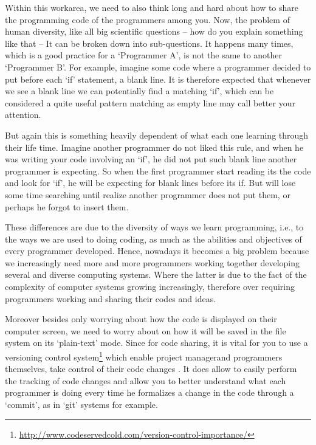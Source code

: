 Within this work\s area, we need to also think long and hard about how to
share the programming code of the programmers among you. Now, the problem of
human diversity, like all big scientific questions -- how do you explain
something like that -- It can be broken down into sub-questions. It happens
many times, which is a good practice for a `Programmer A', is not the same
to another `Programmer B'. For example, imagine some code where a programmer
decided to put before each `if' statement, a blank line. It is therefore
expected that whenever we see a blank line we can potentially find a
matching `if', which can be considered a quite useful pattern matching as
empty line may call better your attention. \cite{aPrettyGoodFormatting}

But again this is something heavily dependent of what each one learning
through their life time. Imagine another programmer do not liked this rule,
and when he was writing your code involving an `if', he did not put such
blank line another programmer is expecting. So when the first programmer
start reading its the code and look for `if', he will be expecting for blank
lines before its if\s. But will lose some time searching until realize
another programmer does not put them, or perhaps he forgot to insert them.
\cite{quantifyingProgramComprehension}

These differences are due to the diversity of ways we learn programming,
i.e., to the ways we are used to doing coding, as much as the abilities and
objectives of every programmer developed. Hence, nowadays it becomes a big
problem because we increasingly need more and more programmers working
together developing several and diverse computing systems. Where the latter
is due to the fact of the complexity of computer systems growing
increasingly, therefore over requiring programmers working and sharing their
codes and ideas. \cite{howProgrammersRead}

Moreover besides only worrying about how the code is displayed on their
computer screen, we need to worry about on how it will be saved in the file
system on its `plain-text' mode. Since for code sharing, it is vital for you
to use a versioning control system\footnote{\url{http://www.codeservedcold.com/version-control-importance/}}
which enable project manager\s and
programmers themselves, take control of their code changes
\cite{redesignOfGit}. It does allow to easily perform the tracking of code
changes \cite{gettingProductive} and
allow you to better understand what each programmer is doing
every time he formalizes a change in the code through a `commit', as in
`git' systems for example. \cite{usingSourceControl}

